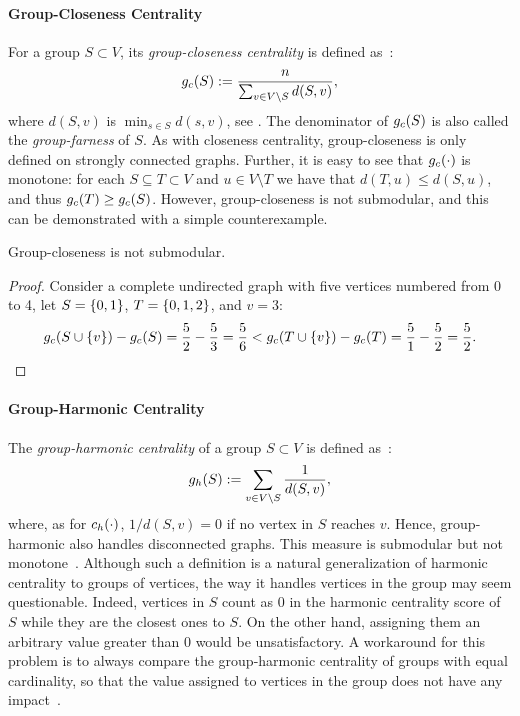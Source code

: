 \paragraph{Group-Closeness Centrality}
For a group $S \subset V$, its \emph{group-closeness centrality} is
defined as~\cite{DBLP:conf/alenex/BergaminiGM18}:
\begin{equation}
\label{eq:prelim:gclos}
g_c(S) := \frac{n}{\sum_{v \in V \setminus S} d(S, v)},
\end{equation}
%
where $d(S, v)$ is $\min_{s \in S}d(s, v)$, see .
The denominator of $g_c(S)$ is also called the \emph{group-farness}
of $S$.
%
As with closeness centrality, group-closeness is only defined on
strongly connected graphs. Further, it is easy to see that $g_c(\cdot)$ is
monotone: for each $S \subseteq T \subset V$ and $u \in V \setminus T$
we have that $d(T, u) \le d(S, u)$, and thus $g_c(T) \ge g_c(S)$.
However, group-closeness is not submodular, and this can be demonstrated with a
simple counterexample.

\begin{lemma}
\label{lemma:prelim:gclos-not-submod}
Group-closeness is not submodular.
\end{lemma}
\begin{proof}
Consider a complete undirected graph with five vertices
numbered from 0 to 4, let $S = \set{0, 1}$, $T = \set{0, 1, 2}$, and $v = 3$:
%
\[
\gclos(S\cup\set{v}) - \gclos(S) = \frac 52 - \frac 53 = \frac 56 < \gclos(T
\cup \set{v}) - \gclos(T) = \frac 51 - \frac 52 = \frac 52.\qedhere
\]
%
\end{proof}

\paragraph{Group-Harmonic Centrality}
The \emph{group-harmonic centrality} of a group $S \subset V$ is
defined as~\cite{DBLP:conf/alenex/AngrimanBDGGM21}:
%
\[g_h(S) := \sum_{v\in V\setminus S} \frac{1}{d(S, v)},\]
%
where, as for $c_h(\cdot)$, $1/d(S,v) = 0$ if no vertex in $S$ reaches $v$.
Hence, group-harmonic also handles disconnected graphs. This measure is
submodular but not
monotone~\cite{DBLP:conf/alenex/AngrimanBDGGM21}.
Although such a definition is a natural generalization of harmonic centrality
to groups of vertices, the way it handles vertices in the group may seem
questionable. Indeed, vertices in $S$ count as 0 in the harmonic centrality
score of $S$ while they are the closest ones to $S$.
%
On the other hand, assigning them an arbitrary value greater than 0 would
be unsatisfactory. A workaround for this problem is to always compare the
group-harmonic centrality of groups with equal cardinality, so that the
value assigned to vertices in the group does not have any
impact~\cite{DBLP:conf/alenex/AngrimanBDGGM21}.

